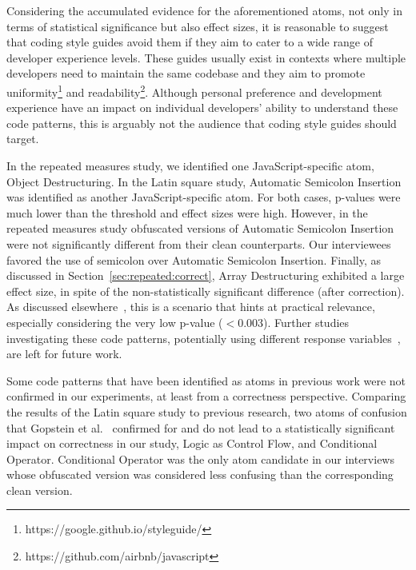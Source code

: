 Considering the accumulated evidence for the aforementioned atoms, not only in terms of statistical significance but also effect sizes, it is reasonable to suggest that coding style guides avoid them if they aim to cater to a wide range of developer experience levels. These guides usually exist in contexts where multiple developers need to maintain the same codebase and they aim to promote uniformity\footnote{https://google.github.io/styleguide/} and readability\footnote{https://github.com/airbnb/javascript}. Although personal preference and development experience have an impact on individual developers' ability to understand these code patterns, this is arguably not the audience that coding style guides should target. 

In the repeated measures study, we identified one JavaScript-specific atom, Object Destructuring. In the Latin square study, Automatic Semicolon Insertion was identified as another JavaScript-specific atom. For both cases, p-values were much lower than the threshold and effect sizes were high. However, in the repeated measures study obfuscated versions of Automatic Semicolon Insertion were not significantly different from their clean counterparts. Our interviewees favored the use of semicolon over Automatic Semicolon Insertion. Finally, as discussed in Section~\ref{sec:repeated:correct}, Array Destructuring exhibited a large effect size, in spite of the non-statistically significant difference (after correction). As discussed elsewhere~\cite{Ellis:2010:EGE}, this is a scenario that hints at practical relevance, especially considering the very low p-value ($< 0.003$). Further studies investigating these code patterns, potentially using different response variables~\cite{Oliveira:2020:ECR,Feitelson:2021:CPC}, are left for future work. 

Some code patterns that have been identified as atoms in previous work were not confirmed in our experiments, at least from a correctness perspective. Comparing the results of the Latin square study to previous research, two atoms of confusion that Gopstein et al.~\cite{DBLP:conf/sigsoft/GopsteinIYDZYC17} confirmed for \clang and \cpplang do not lead to a statistically significant impact on correctness in our study, Logic as Control Flow, and Conditional Operator. Conditional Operator was the only atom candidate in our interviews whose obfuscated version was considered less confusing than the corresponding clean version. 

